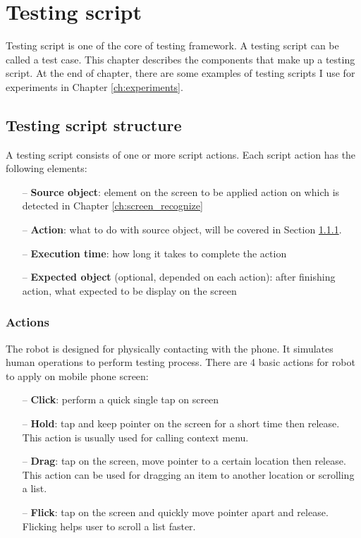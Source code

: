 \chapter{Testing script}
Testing script is one of the core of testing framework.
A testing script can be called a test case.
This chapter describes the components that make up a testing script. At the end of chapter, there are some examples of testing scripts I use for experiments in Chapter \ref{ch:experiments}.

\section{Testing script structure}
\label{sec:script_comp}
A testing script consists of one or more script actions. Each script action has the following elements:
    \begin{itemize}
		\item[--] \textbf{Source object}: element on the screen to be applied action on which is detected in Chapter \ref{ch:screen_recognize}
		\item[--] \textbf{Action}: what to do with source object, will be covered in Section \ref{sec:actions}.
		\item[--] \textbf{Execution time}: how long it takes to complete the action
		\item[--] \textbf{Expected object} (optional, depended on each action): after finishing action, what expected to be display on the screen
	\end{itemize}

\subsection{Actions}
\label{sec:actions}
The robot is designed for physically contacting with the phone. It simulates human operations to perform testing process.
There are 4 basic actions for robot to apply on mobile phone screen:

    \begin{itemize}
		\item[--] \textbf{Click}: perform a quick single tap on screen
		\item[--] \textbf{Hold}: tap and keep pointer on the screen for a short time then release. This action is usually used for calling context menu.
		\item[--] \textbf{Drag}: tap on the screen, move pointer to a certain location then release. This action can be used for dragging an item to another location or scrolling a list.
		\item[--] \textbf{Flick}: tap on the screen and quickly move pointer apart and release. Flicking helps user to scroll a list faster.
	\end{itemize}

